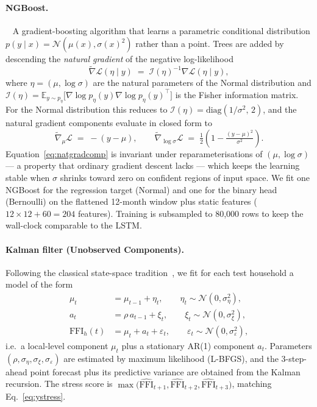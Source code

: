 \documentclass[colorlinks,balance]{asmeconf}
\begin{document}
\paragraph{NGBoost.}~\cite{duan2020ngboost} A gradient-boosting algorithm that learns a parametric conditional distribution $p(y \mid x) = \mathcal{N}(\mu(x), \sigma(x)^2)$ rather than a point. Trees are added by descending the \emph{natural gradient} of the negative log-likelihood
\begin{equation}\label{eq:natgrad}
\tilde\nabla \mathcal{L}(\eta \mid y) \;=\; \mathcal{I}(\eta)^{-1} \nabla \mathcal{L}(\eta \mid y),
\end{equation}
where $\eta = (\mu, \log\sigma)$ are the natural parameters of the Normal distribution and $\mathcal{I}(\eta) = \mathbb{E}_{y \sim p_\eta}\!\big[\nabla \log p_\eta(y) \nabla \log p_\eta(y)^\top\big]$ is the Fisher information matrix. For the Normal distribution this reduces to $\mathcal{I}(\eta) = \mathrm{diag}(1/\sigma^2,\, 2)$, and the natural gradient components evaluate in closed form to
\begin{equation}\label{eq:natgradcomp}
\tilde\nabla_\mu \mathcal{L} \;=\; -(y - \mu),\qquad \tilde\nabla_{\log\sigma} \mathcal{L} \;=\; \tfrac{1}{2}\!\left(1 - \tfrac{(y-\mu)^2}{\sigma^2}\right).
\end{equation}
Equation~\eqref{eq:natgradcomp} is invariant under reparameterisations of $(\mu, \log\sigma)$ --- a property that ordinary gradient descent lacks --- which keeps the learning stable when $\sigma$ shrinks toward zero on confident regions of input space. We fit one NGBoost for the regression target (Normal) and one for the binary head (Bernoulli) on the flattened 12-month window plus static features ($12 \!\times\! 12 + 60 \!=\! 204$ features). Training is subsampled to 80{,}000 rows to keep the wall-clock comparable to the LSTM.

\paragraph{Kalman filter (Unobserved Components).} Following the classical state-space tradition~\cite{kalman1960filter}, we fit for each test household a model of the form
\begin{align}
\mu_t &= \mu_{t\!-\!1} + \eta_t,\qquad \eta_t \sim \mathcal{N}(0, \sigma_\eta^2), \label{eq:level} \\
a_t &= \rho\, a_{t\!-\!1} + \xi_t,\qquad \xi_t \sim \mathcal{N}(0, \sigma_\xi^2), \label{eq:ar} \\
\mathrm{FFI}_h(t) &= \mu_t + a_t + \varepsilon_t,\qquad \varepsilon_t \sim \mathcal{N}(0, \sigma_\varepsilon^2), \label{eq:obs}
\end{align}
i.e.\ a local-level component $\mu_t$ plus a stationary AR(1) component $a_t$. Parameters $(\rho, \sigma_\eta, \sigma_\xi, \sigma_\varepsilon)$ are estimated by maximum likelihood (L-BFGS), and the 3-step-ahead point forecast plus its predictive variance are obtained from the Kalman recursion. The stress score is $\max\!\big(\hat{\mathrm{FFI}}_{t\!+\!1}, \hat{\mathrm{FFI}}_{t\!+\!2}, \hat{\mathrm{FFI}}_{t\!+\!3}\big)$, matching Eq.~\eqref{eq:ystress}.
\end{document}
